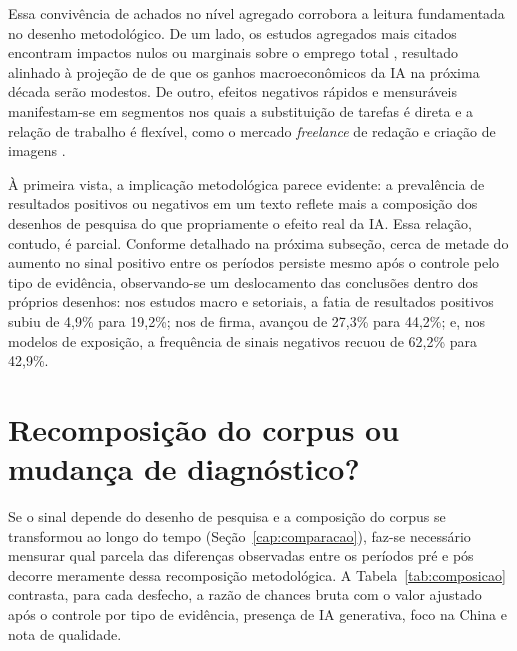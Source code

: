 Essa convivência de achados no nível agregado corrobora a leitura fundamentada no desenho metodológico. De um lado, os estudos agregados mais citados encontram impactos nulos ou marginais sobre o emprego total \parencite{acemogluVacancies2022, kauhanenRouvinen2025}, resultado alinhado à projeção de \textcite{acemoglu2025simple} de que os ganhos macroeconômicos da IA na próxima década serão modestos. De outro, efeitos negativos rápidos e mensuráveis manifestam-se em segmentos nos quais a substituição de tarefas é direta e a relação de trabalho é flexível, como o mercado \textit{freelance} de redação e criação de imagens \parencite{huiReshefZhou2024}.

À primeira vista, a implicação metodológica parece evidente: a prevalência de resultados positivos ou negativos em um texto reflete mais a composição dos desenhos de pesquisa do que propriamente o efeito real da IA. Essa relação, contudo, é parcial. Conforme detalhado na próxima subseção, cerca de metade do aumento no sinal positivo entre os períodos persiste mesmo após o controle pelo tipo de evidência, observando-se um deslocamento das conclusões dentro dos próprios desenhos: nos estudos macro e setoriais, a fatia de resultados positivos subiu de 4,9\% para 19,2\%; nos de firma, avançou de 27,3\% para 44,2\%; e, nos modelos de exposição, a frequência de sinais negativos recuou de 62,2\% para 42,9\%.

\section{Recomposição do corpus ou mudança de diagnóstico?}

Se o sinal depende do desenho de pesquisa e a composição do corpus se transformou ao longo do tempo (Seção~\ref{cap:comparacao}), faz-se necessário mensurar qual parcela das diferenças observadas entre os períodos pré e pós decorre meramente dessa recomposição metodológica. A Tabela~\ref{tab:composicao} contrasta, para cada desfecho, a razão de chances bruta com o valor ajustado após o controle por tipo de evidência, presença de IA generativa, foco na China e nota de qualidade.

\begin{table}[htbp]
\centering
\caption{Diferenças pré/pós brutas e ajustadas pela composição do corpus.}
\label{tab:composicao}
{\small}
\end{table}

